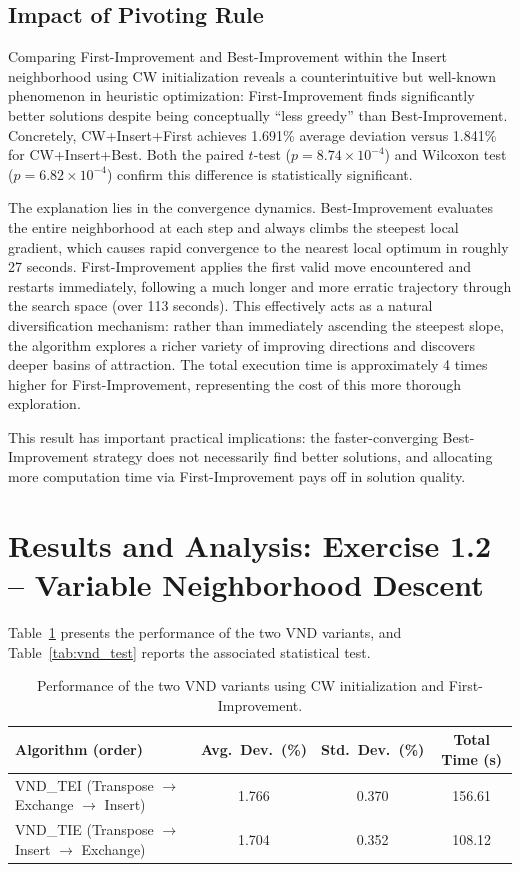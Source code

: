 \documentclass[11pt, a4paper]{article}
\begin{document}
\subsection{Impact of Pivoting Rule}

Comparing First-Improvement and Best-Improvement within the Insert neighborhood using CW initialization reveals a counterintuitive but well-known phenomenon in heuristic optimization: First-Improvement finds significantly better solutions despite being conceptually ``less greedy'' than Best-Improvement. Concretely, CW+Insert+First achieves 1.691\% average deviation versus 1.841\% for CW+Insert+Best. Both the paired $t$-test ($p = 8.74 \times 10^{-4}$) and Wilcoxon test ($p = 6.82 \times 10^{-4}$) confirm this difference is statistically significant.

The explanation lies in the convergence dynamics. Best-Improvement evaluates the entire neighborhood at each step and always climbs the steepest local gradient, which causes rapid convergence to the nearest local optimum in roughly 27 seconds. First-Improvement applies the first valid move encountered and restarts immediately, following a much longer and more erratic trajectory through the search space (over 113 seconds). This effectively acts as a natural diversification mechanism: rather than immediately ascending the steepest slope, the algorithm explores a richer variety of improving directions and discovers deeper basins of attraction. The total execution time is approximately 4 times higher for First-Improvement, representing the cost of this more thorough exploration.

This result has important practical implications: the faster-converging Best-Improvement strategy does not necessarily find better solutions, and allocating more computation time via First-Improvement pays off in solution quality.

\section{Results and Analysis: Exercise 1.2 -- Variable Neighborhood Descent}
\label{sec:results12}

Table~\ref{tab:vnd} presents the performance of the two VND variants, and Table~\ref{tab:vnd_test} reports the associated statistical test.


\begin{table}[h]
\centering
\caption{Performance of the two VND variants using CW initialization and First-Improvement.}
\label{tab:vnd}
\begin{tabular}{lccc}
\toprule
\textbf{Algorithm (order)} & \textbf{Avg.\ Dev.\ (\%)} & \textbf{Std.\ Dev.\ (\%)} & \textbf{Total Time (s)} \\
\midrule
VND\_TEI (Transpose $\to$ Exchange $\to$ Insert) & 1.766 & 0.370 & 156.61 \\
VND\_TIE (Transpose $\to$ Insert $\to$ Exchange) & 1.704 & 0.352 & 108.12 \\
\bottomrule
\end{tabular}
\end{table}
\end{document}
